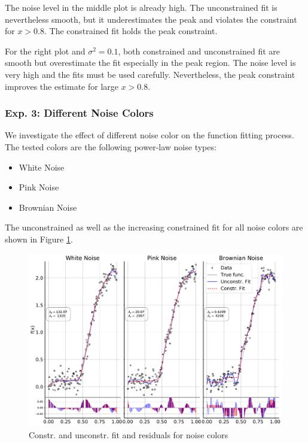 \documentclass[10pt,a4paper]{article}
\begin{document}
The noise level in the middle plot is already high. The unconstrained fit is nevertheless smooth, but it underestimates the peak and violates the constraint for $x > 0.8$. The constrained fit holds the peak constraint. 

For the right plot and $\sigma^2=0.1$, both constrained and unconstrained fit are smooth but overestimate the fit especially in the peak region. The noise level is very high and the fits must be used carefully. Nevertheless, the peak constraint improves the estimate for large $x > 0.8$. 

\subsubsection{Exp. 3: Different Noise Colors}

We investigate the effect of different noise color on the function fitting process. The tested colors are the following power-law noise types:

\begin{itemize}
	\item  White Noise
	\item Pink Noise
	\item Brownian Noise
\end{itemize}

The unconstrained as well as the increasing constrained fit for all noise colors are shown in Figure \ref{fig:fit_noise_colors}.

\begin{figure}[H]
	\centering
	\includegraphics[width=\columnwidth]{../thesisplots/exp_noise_colors.pdf}
	\caption{Constr. and unconstr. fit and residuals for noise colors}
	\label{fig:fit_noise_colors}
\end{figure}
\end{document}
